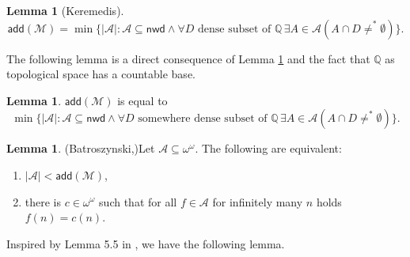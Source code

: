 \documentclass{amsart}
\theoremstyle{definition}
\newtheorem{lemma}[theorem]{Lemma}
\theoremstyle{remark}
\numberwithin{equation}{section}
\newcommand{\nwd}{\mathsf{nwd}}
\newcommand{\add}{\mathsf{add}}
\begin{document}
\begin{lemma}[Keremedis]\label{kere}
    \[\add(\mathcal{M})=\min \{|\mathcal{A}|: \mathcal{A}\subseteq \nwd \wedge \forall D \text{ dense subset of }\mathbb{Q}\, \exists A\in\mathcal{A} (A\cap D \not=^*\emptyset)\}. \]
\end{lemma}


The following lemma is a direct consequence of Lemma \ref{kere} and the fact that $\mathbb{Q}$ as topological space has a countable base.

\begin{lemma}\label{swd} $\add(\mathcal{M})$ is equal to
    \[\min \{|\mathcal{A}|: \mathcal{A}\subseteq \nwd \wedge \forall D \text{ somewhere dense subset of }\mathbb{Q}\, \exists A\in\mathcal{A} (A\cap D \not=^*\emptyset)\}.\]
\end{lemma}

\begin{lemma}(Batroszynski,\cite{barto})\label{barto cov}
    Let $\mathcal{A}\subseteq \omega^\omega$. The following are equivalent:
    \begin{enumerate}
        \item $|\mathcal{A}|<\add(\mathcal{M})$,
        \item there is $c\in\omega^\omega$ such that for all $f\in \mathcal{A}$ for infinitely many $n$ holds $f(n)=c(n)$.
    \end{enumerate}
\end{lemma}

Inspired by Lemma 5.5 in \cite{fullmil}, we have the following lemma.
\end{document}
